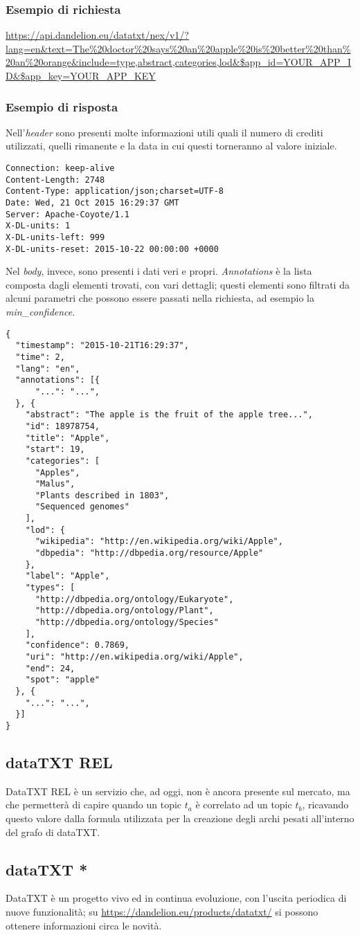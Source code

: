 	\subsubsection{Esempio di richiesta}
		\url{https://api.dandelion.eu/datatxt/nex/v1/?lang=en&text=The%20doctor%20says%20an%20apple%20is%20better%20than%20an%20orange&include=type,abstract,categories,lod&$app_id=YOUR_APP_ID&$app_key=YOUR_APP_KEY}
        \subsubsection{Esempio di risposta}
		Nell'\emph{header} sono presenti molte informazioni utili quali il numero di crediti utilizzati, quelli rimanente e la data in cui questi torneranno al valore iniziale.
		
		\begin{lstlisting}
Connection: keep-alive
Content-Length: 2748
Content-Type: application/json;charset=UTF-8
Date: Wed, 21 Oct 2015 16:29:37 GMT
Server: Apache-Coyote/1.1
X-DL-units: 1
X-DL-units-left: 999
X-DL-units-reset: 2015-10-22 00:00:00 +0000
		\end{lstlisting}

		Nel \emph{body}, invece, sono presenti i dati veri e propri. \emph{Annotations} è la lista composta dagli elementi trovati, con vari dettagli; questi elementi sono filtrati da alcuni parametri che possono essere passati nella richiesta,  ad esempio la \emph{min\_confidence}.

		\begin{lstlisting}
{
  "timestamp": "2015-10-21T16:29:37",
  "time": 2,
  "lang": "en",
  "annotations": [{
      "...": "...",
  }, {
    "abstract": "The apple is the fruit of the apple tree...",
    "id": 18978754,
    "title": "Apple",
    "start": 19,
    "categories": [
      "Apples",
      "Malus",
      "Plants described in 1803",
      "Sequenced genomes"
    ],
    "lod": {
      "wikipedia": "http://en.wikipedia.org/wiki/Apple",
      "dbpedia": "http://dbpedia.org/resource/Apple"
    },
    "label": "Apple",
    "types": [
      "http://dbpedia.org/ontology/Eukaryote",
      "http://dbpedia.org/ontology/Plant",
      "http://dbpedia.org/ontology/Species"
    ],
    "confidence": 0.7869,
    "uri": "http://en.wikipedia.org/wiki/Apple",
    "end": 24,
    "spot": "apple"
  }, {
    "...": "...",
  }]
}
		\end{lstlisting}

\subsection{dataTXT REL}
	DataTXT REL  è un servizio che, ad oggi, non è ancora presente sul mercato, ma che permetterà di capire quando un topic $t_a$ è correlato ad un topic $t_b$, ricavando questo valore dalla formula utilizzata per la creazione degli archi pesati all'interno del grafo di dataTXT.

\subsection{dataTXT *}
	DataTXT è un progetto vivo ed in continua evoluzione, con l'uscita periodica di nuove funzionalità; su \url{https://dandelion.eu/products/datatxt/} si possono ottenere informazioni circa le novità.




